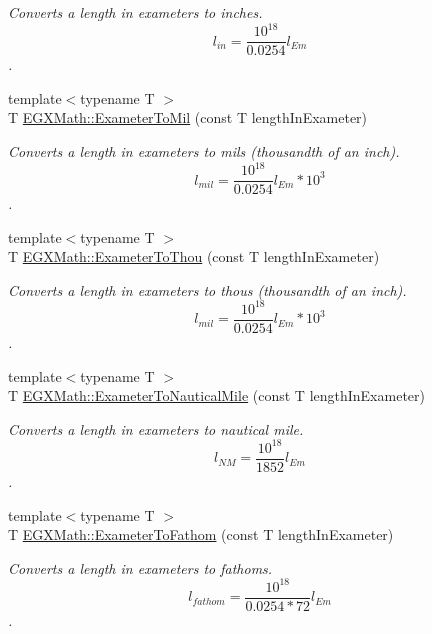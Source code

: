 \begin{DoxyCompactItemize}
\begin{DoxyCompactList}\small\item\em Converts a length in exameters to inches. \[ l_{in}= \frac{10^{18}}{0.0254} l_{Em} \]. \end{DoxyCompactList}\item 
{\footnotesize template$<$typename T $>$ }\\T \mbox{\hyperlink{group___e_g_x_math-_conversions-_length_conversions-_s_i-_exameter-_imperial_ga863f9f7f7e2826324fec642027c48614}{E\+G\+X\+Math\+::\+Exameter\+To\+Mil}} (const T length\+In\+Exameter)
\begin{DoxyCompactList}\small\item\em Converts a length in exameters to mils (thousandth of an inch). \[ l_{mil}= \frac{10^{18}}{0.0254} l_{Em} * 10^{3} \]. \end{DoxyCompactList}\item 
{\footnotesize template$<$typename T $>$ }\\T \mbox{\hyperlink{group___e_g_x_math-_conversions-_length_conversions-_s_i-_exameter-_imperial_gafee1930a425fcae4f9a3d8631aa62b05}{E\+G\+X\+Math\+::\+Exameter\+To\+Thou}} (const T length\+In\+Exameter)
\begin{DoxyCompactList}\small\item\em Converts a length in exameters to thous (thousandth of an inch). \[ l_{mil}= \frac{10^{18}}{0.0254} l_{Em} * 10^{3} \]. \end{DoxyCompactList}\item 
{\footnotesize template$<$typename T $>$ }\\T \mbox{\hyperlink{group___e_g_x_math-_conversions-_length_conversions-_s_i-_exameter-_nautical_gaf593ae9d78bd889caca4e9249be1464a}{E\+G\+X\+Math\+::\+Exameter\+To\+Nautical\+Mile}} (const T length\+In\+Exameter)
\begin{DoxyCompactList}\small\item\em Converts a length in exameters to nautical mile. \[ l_{NM}= \frac{10^{18}}{1852} l_{Em} \]. \end{DoxyCompactList}\item 
{\footnotesize template$<$typename T $>$ }\\T \mbox{\hyperlink{group___e_g_x_math-_conversions-_length_conversions-_s_i-_exameter-_nautical_gab6f73111fd59a46fb28473d73ddb6033}{E\+G\+X\+Math\+::\+Exameter\+To\+Fathom}} (const T length\+In\+Exameter)
\begin{DoxyCompactList}\small\item\em Converts a length in exameters to fathoms. \[ l_{fathom}= \frac{10^{18}}{0.0254 * 72} l_{Em} \]. \end{DoxyCompactList}\item 

\end{DoxyCompactItemize}

